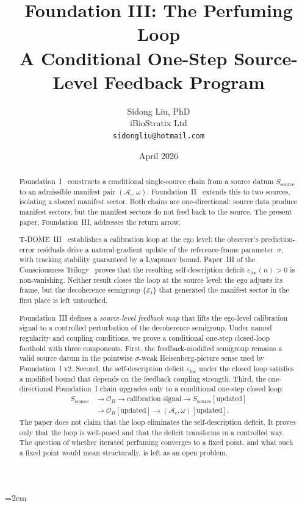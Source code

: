 \documentclass[12pt]{article}
\title{%
  \textbf{Foundation III: The Perfuming Loop}\\
  \textbf{A Conditional One-Step Source-Level Feedback Program}%
}
\author{
  Sidong Liu, PhD \\
  \small iBioStratix Ltd \\
  \small \texttt{sidongliu@hotmail.com}
}
\date{April 2026}
\theoremstyle{definition}
\theoremstyle{remark}
\begin{document}
\emergencystretch=2em
\raggedbottom
{}

\maketitle

\begin{abstract}
Foundation~I~\cite{FoundationI} constructs a conditional single-source
chain from a source datum \(S_{\mathrm{source}}\) to an admissible
manifest pair \((\mathcal A_c,\omega)\). Foundation~II~\cite{FoundationII}
extends this to two sources, isolating a shared manifest sector. Both
chains are one-directional: source data produce manifest sectors, but
the manifest sectors do not feed back to the source. The present paper,
Foundation~III, addresses the return arrow.

T-DOME~III~\cite{TDOMEIII} establishes a calibration loop at the ego
level: the observer's prediction-error residuals drive a natural-gradient
update of the reference-frame parameter~\(\sigma\), with tracking
stability guaranteed by a Lyapunov bound. Paper~III of the
Consciousness Trilogy~\cite{PaperIII} proves that the resulting
self-description deficit \(\varepsilon_{\mathrm{loc}}(n)>0\) is
non-vanishing. Neither result closes the loop at the source level: the
ego adjusts its frame, but the decoherence semigroup
\(\{\mathcal E_t\}\) that generated the manifest sector in the first
place is left untouched.

Foundation~III defines a \emph{source-level feedback map} that lifts the
ego-level calibration signal to a controlled perturbation of the
decoherence semigroup. Under named regularity and coupling conditions,
we prove a conditional one-step closed-loop foothold with three
components. First, the feedback-modified semigroup remains a valid
source datum in the pointwise \(\sigma\)-weak Heisenberg-picture sense
used by Foundation~I v2. Second, the
self-description deficit \(\varepsilon_{\mathrm{loc}}\) under the
closed loop satisfies a modified bound that depends on the feedback
coupling strength. Third, the one-directional Foundation~I chain
upgrades only to a conditional one-step closed loop:
\[
\begin{aligned}
S_{\mathrm{source}}
&\longrightarrow
\mathcal O_B
\longrightarrow
\text{calibration signal}
\longrightarrow
S_{\mathrm{source}}[\text{updated}]\\
&\longrightarrow
\mathcal O_B[\text{updated}]
\longrightarrow
(\mathcal A_c,\omega)[\text{updated}].
\end{aligned}
\]
The paper does not claim that the loop eliminates the self-description
deficit. It proves only that the loop is well-posed and that the deficit
transforms in a controlled way. The question of whether iterated
perfuming converges to a fixed point, and what such a fixed point would
mean structurally, is left as an open problem.
\end{abstract}
\end{document}
